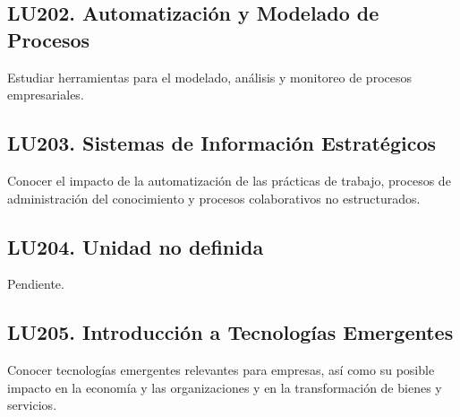 \subsection{LU202. Automatización y Modelado de Procesos}\label{sec:LU202}
\begin{LearningUnit}
\begin{LUGoal}
\item Estudiar herramientas para el modelado, análisis y monitoreo de procesos empresariales.
\end{LUGoal}

\end{LearningUnit}

\subsection{LU203. Sistemas de Información Estratégicos}\label{sec:LU203}
\begin{LearningUnit}
\begin{LUGoal}
\item Conocer el impacto de la automatización de las prácticas de trabajo, procesos de administración del conocimiento y procesos colaborativos no estructurados.
\end{LUGoal}

\end{LearningUnit}

\subsection{LU204. Unidad no definida}\label{sec:LU204}
\begin{LearningUnit}
\begin{LUGoal}
\item Pendiente.
\end{LUGoal}

\end{LearningUnit}

\subsection{LU205. Introducción a Tecnologías Emergentes}\label{sec:LU205}
\begin{LearningUnit}
\begin{LUGoal}
\item Conocer tecnologías emergentes relevantes para empresas, así como su posible impacto en la economía y las organizaciones y en la transformación de bienes y servicios.
\end{LUGoal}

\end{LearningUnit}

